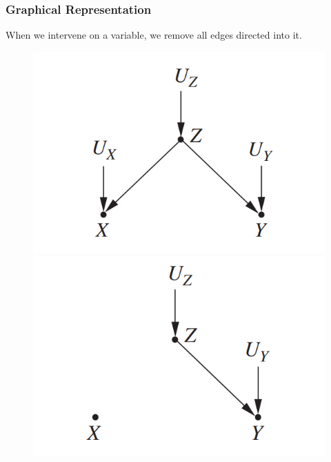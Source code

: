 \documentclass{beamer}
\begin{document}
\begin{frame}
    \frametitle{Graphical Representation}
    When we intervene on a variable, we remove all edges directed into it.
    \begin{figure}[htbp]
        \centering
        \begin{minipage}[t]{0.48\textwidth}
        \centering
        \includegraphics[scale=0.6]{fig11.png}
        \end{minipage}
        \begin{minipage}[t]{0.48\textwidth}
        \centering
        \includegraphics[scale=0.6]{fig12.png}
        \end{minipage}
    \end{figure}
\end{frame}
\end{document}
